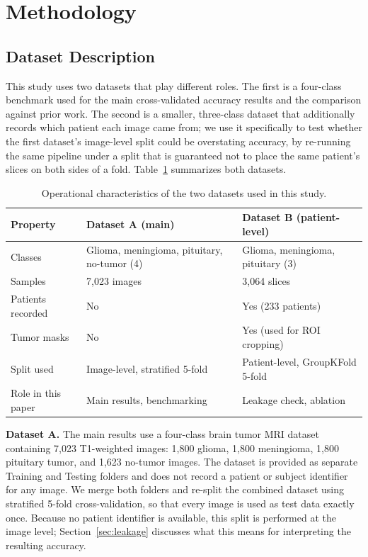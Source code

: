 \documentclass[conference]{IEEEtran}
\begin{document}
\section{Methodology}
\label{sec:methodology}

\subsection{Dataset Description}
\label{sec:datasets}

This study uses two datasets that play different roles. The first is a four-class benchmark used for the main cross-validated accuracy results and the comparison against prior work. The second is a smaller, three-class dataset that additionally records which patient each image came from; we use it specifically to test whether the first dataset's image-level split could be overstating accuracy, by re-running the same pipeline under a split that is guaranteed not to place the same patient's slices on both sides of a fold. Table~\ref{tab:datasets} summarizes both datasets.

\begin{table}[!htbp]
\centering
\caption{Operational characteristics of the two datasets used in this study.}
\begin{tabular}{|p{2.1cm}|p{2.7cm}|p{2.7cm}|}
\hline
\textbf{Property} & \textbf{Dataset A (main)} & \textbf{Dataset B (patient-level)} \\ \hline
Classes & Glioma, meningioma, pituitary, no-tumor (4) & Glioma, meningioma, pituitary (3) \\ \hline
Samples & 7,023 images & 3,064 slices \\ \hline
Patients recorded & No & Yes (233 patients) \\ \hline
Tumor masks & No & Yes (used for ROI cropping) \\ \hline
Split used & Image-level, stratified 5-fold & Patient-level, GroupKFold 5-fold \\ \hline
Role in this paper & Main results, benchmarking & Leakage check, ablation \\ \hline
\end{tabular}
\label{tab:datasets}
\end{table}

\textbf{Dataset A.} The main results use a four-class brain tumor MRI dataset containing 7,023 T1-weighted images: 1,800 glioma, 1,800 meningioma, 1,800 pituitary tumor, and 1,623 no-tumor images. The dataset is provided as separate Training and Testing folders and does not record a patient or subject identifier for any image. We merge both folders and re-split the combined dataset using stratified 5-fold cross-validation, so that every image is used as test data exactly once. Because no patient identifier is available, this split is performed at the image level; Section~\ref{sec:leakage} discusses what this means for interpreting the resulting accuracy.
\end{document}
